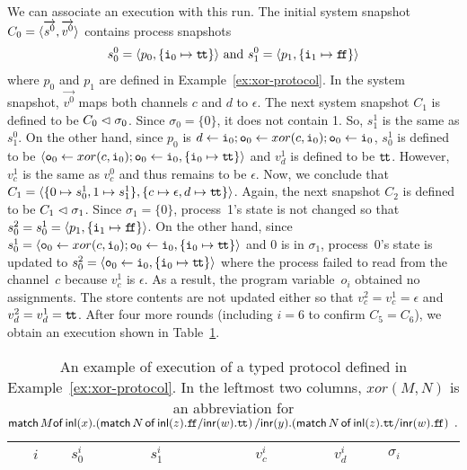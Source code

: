 {\begin{example}
  We can associate an execution with this run.
  The initial system snapshot $C_0=\langle{\overrightarrow{s^0},\overrightarrow{v^0}}\rangle$ contains
  process snapshots
  \begin{align*}
   s_0^0 = \langle{p_0,\{\texttt{i}_0\mapsto \texttt{t\kern -1.2pt t}\}}\rangle\text{ and }
   s_1^0 = \langle{p_1,\{\texttt{i}_1\mapsto \texttt{f\kern -1.7pt f}\}}\rangle
  \end{align*}
  where $p_0$ and $p_1$ are defined in Example~\ref{ex:xor-protocol}.
  In the system snapshot, $\vec{v^0}$ maps both channels $c$ and $d$ to
  $\epsilon$.
  The next system snapshot $C_1$ is defined to be $C_0\vartriangleleft\sigma_0$.
  Since $\sigma_0 = \{0\}$, it does not contain 1.
  So, $s_1^1$ is the same as $s_1^0$.
  On the other hand, since $p_0$ is $d\leftarrow \texttt{i}_0; \texttt{o}_0\leftarrow
  xor(c, \texttt{i}_0); \texttt{o}_0
   \leftarrow \texttt{i}_0$, $s_0^1$ is defined to be
  $\langle{\texttt{o}_0\leftarrow
  xor(c, \texttt{i}_0); \texttt{o}_0
   \leftarrow \texttt{i}_0, \{\texttt{i}_0\mapsto \texttt{t\kern -1.2pt t}\}}\rangle$ and
  $v_d^1$ is defined to be $\texttt{t\kern -1.2pt t}$.
  However, $v_c^1$ is the same as $v_c^0$ and thus remains to be
  $\epsilon$.
  Now, we conclude that $C_1=\langle{\{0\mapsto s_0^1,1\mapsto s_1^1\},
  \{c\mapsto \epsilon, d\mapsto \texttt{t\kern -1.2pt t}\}}\rangle$.
  Again, the next snapshot $C_2$ is defined to be $C_1\vartriangleleft \sigma_1$.
  Since $\sigma_1 = \{0\}$, process~1's state is not changed so that
  $s_0^2 = s_0^1 = \langle{p_1,\{\texttt{i}_1\mapsto\texttt{f\kern -1.7pt f}\}}\rangle$.
  On the other hand, since $s_0^1 = \langle{\texttt{o}_0\leftarrow
  xor(c, \texttt{i}_0); \texttt{o}_0
   \leftarrow \texttt{i}_0, \{\texttt{i}_0\mapsto \texttt{t\kern -1.2pt t}\}}\rangle$ and 0 is in $\sigma_1$,
  process~0's state is updated to
  $s_0^2 = \langle{\texttt{o}_0
   \leftarrow \texttt{i}_0, \{\texttt{i}_0\mapsto \texttt{t\kern -1.2pt t}\}}\rangle$
  where the process failed to read from the channel~$c$ because $v_c^1$
  is $\epsilon$.  As a result, the program variable~$o_i$ obtained
  no assignments.
  The store contents are not updated either so that $v_c^2 = v_c^1 =
  \epsilon$ and $v_d^2 = v_d^1 = \texttt{t\kern -1.2pt t}$.
  After four more rounds (including $i = 6$ to confirm $C_5 = C_6$), we
  obtain an execution shown in Table~\ref{table:exec}.
 \end{example}
  \begin{sidewaystable}
   \centering
   \caption{An example of execution of a typed protocol defined in
   Example~\ref{ex:xor-protocol}.
   In the leftmost two columns,
   $xor(M,N)$ is an abbreviation for
   $\mathsf{match\,}{M}\mathsf{of}\,\mathsf{inl}({x}).{
  (\mathsf{match}\,{N}\,\mathsf{of}\, \mathsf{inl}({z}). {\texttt{f\kern -1.7pt f}}/ \mathsf{inr}({w}). {\texttt{t\kern -1.2pt t}})
  }\,/ \mathsf{inr}({y}).{
  (\mathsf{match}\,{N}\,\mathsf{of}\, \mathsf{inl}({z}). {\texttt{t\kern -1.2pt t}}/ \mathsf{inr}({w}). {\texttt{f\kern -1.7pt f}})
  }\enspace.$
   }
   \label{table:exec}
   \begin{tabular}{cllcc|l}
    $i$    & $s_0^i$&$s_1^i$ &$v_c^i$ &$v_d^i$ & $\sigma_i$ \\ \hline

\end{tabular}
\end{sidewaystable}}
